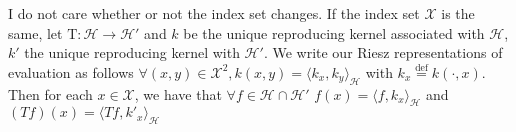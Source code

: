 I do not care whether or not the index set changes. If the index set $\mathcal{X}$ is the same, let $\mathrm{T}:\mathcal{H}\to\mathcal{H}'$ and $k$ be the unique reproducing kernel associated with $\mathcal{H}$, $k'$ the unique reproducing kernel with $\mathcal{H}'$. We write our Riesz representations of evaluation as follows $\forall (x,y)\in\mathcal{X}^2, k(x,y) = \langle k_x, k_y\rangle_{\mathcal{H}}$ with $k_x \overset{\text{def}}=k(\cdot,x)$. Then for each $x\in\mathcal{X}$, we have that $\forall f\in\mathcal{H}\cap\mathcal{H}'$
$f(x) = \langle f, k_x\rangle_{\mathcal{H}}$ and $(Tf)(x) = \langle Tf, k'_x\rangle_{\mathcal{H}}$ 

